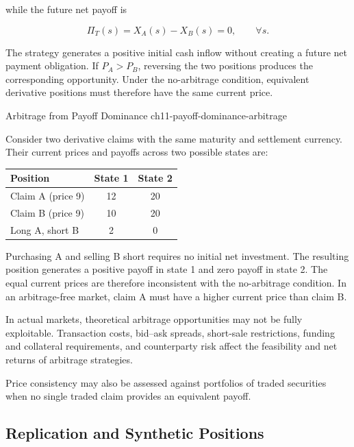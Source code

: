 while the future net payoff is

\begin{equation}
\Pi_T(s)=X_A(s)-X_B(s)=0,
\qquad \forall s.
\end{equation}

The strategy generates a positive initial cash
inflow without creating a future net payment
obligation. If $P_A>P_B$, reversing the two
positions produces the corresponding opportunity.
Under the no-arbitrage condition, equivalent
derivative positions must therefore have the
same current price.

\begin{example}{Arbitrage from Payoff Dominance}
{ch11-payoff-dominance-arbitrage}

Consider two derivative claims with the same
maturity and settlement currency. Their current
prices and payoffs across two possible states are:

\begin{center}
\begin{tabular}{lcc}
\toprule
\textbf{Position}
& \textbf{State 1}
& \textbf{State 2} \\
\midrule
Claim A (price 9) & 12 & 20 \\
Claim B (price 9) & 10 & 20 \\
\midrule
Long A, short B & 2 & 0 \\
\bottomrule
\end{tabular}
\end{center}

Purchasing A and selling B short requires no
initial net investment. The resulting position
generates a positive payoff in state 1 and zero
payoff in state 2. The equal current prices are
therefore inconsistent with the no-arbitrage
condition. In an arbitrage-free market, claim A
must have a higher current price than claim B.

\end{example}

In actual markets, theoretical arbitrage opportunities
may not be fully exploitable. Transaction costs,
bid--ask spreads, short-sale restrictions, funding
and collateral requirements, and counterparty risk
affect the feasibility and net returns of arbitrage
strategies. 

Price consistency may also be assessed against
portfolios of traded securities when no single
traded claim provides an equivalent payoff.


\subsection{Replication and Synthetic Positions}

